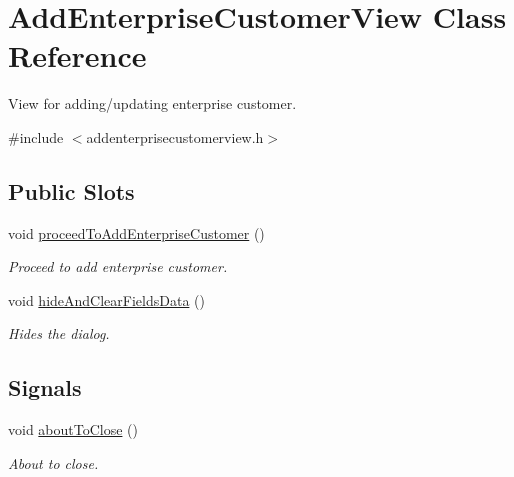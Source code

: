 \hypertarget{class_add_enterprise_customer_view}{\section{\-Add\-Enterprise\-Customer\-View \-Class \-Reference}
\label{class_add_enterprise_customer_view}
}


\-View for adding/updating enterprise customer.  




{\ttfamily \#include $<$addenterprisecustomerview.\-h$>$}

\subsection*{\-Public \-Slots}
\begin{DoxyCompactItemize}
\item 
void \hyperlink{class_add_enterprise_customer_view_ab952a2ca65c51b0232bb9a328e2bbbd2}{proceed\-To\-Add\-Enterprise\-Customer} ()
\begin{DoxyCompactList}\small\item\em \-Proceed to add enterprise customer. \end{DoxyCompactList}\item 
void \hyperlink{class_add_enterprise_customer_view_afe0572ad30de3a8a6d29a3dff3432650}{hide\-And\-Clear\-Fields\-Data} ()
\begin{DoxyCompactList}\small\item\em \-Hides the dialog. \end{DoxyCompactList}\end{DoxyCompactItemize}
\subsection*{\-Signals}
\begin{DoxyCompactItemize}
\item 
void \hyperlink{class_add_enterprise_customer_view_a657648b20438f4255219dace533f6f5c}{about\-To\-Close} ()
\begin{DoxyCompactList}\small\item\em \-About to close. \end{DoxyCompactList}\end{DoxyCompactItemize}
